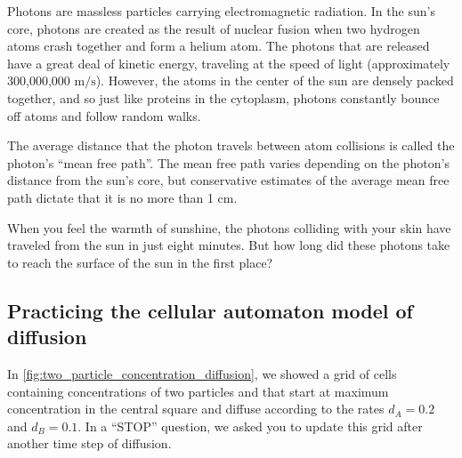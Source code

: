 Photons are massless particles carrying electromagnetic radiation. In the sun's core, photons are created as the result of nuclear fusion when two hydrogen atoms crash together and form a helium atom. The photons that are released have a great deal of kinetic energy, traveling at the speed of light (approximately 300,000,000 $\text{m}/\text{s}$). However, the atoms in the center of the sun are densely packed together, and so just like proteins in the cytoplasm, photons constantly bounce off atoms and follow random walks.

The average distance that the photon travels between atom collisions is called the photon's ``mean free path''. The mean free path varies depending on the photon's distance from the sun's core, but conservative estimates of the average mean free path dictate that it is no more than 1 cm.\\

\begin{exercise}\end{exercise}

When you feel the warmth of sunshine, the photons colliding with your skin have traveled from the sun in just eight minutes. But how long did these photons take to reach the surface of the sun in the first place?\\

\begin{exercise}\end{exercise}

\subsection{Practicing the cellular automaton model of diffusion}

In \autoref{fig:two_particle_concentration_diffusion}, we showed a grid of cells containing concentrations of two particles  and  that start at maximum concentration in the central square and diffuse according to the rates $d_A = 0.2$ and $d_B = 0.1$. In a ``STOP'' question, we asked you to update this grid after another time step of diffusion.\\

